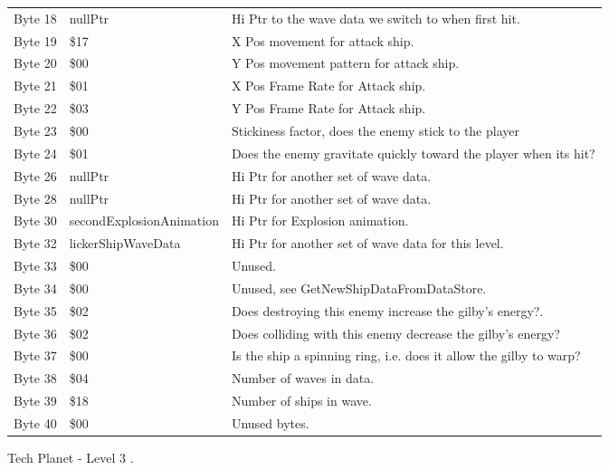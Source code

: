 \begin{figure}[H]
{\begin{adjustbox}{width=12cm}
\begin{tabular}{lll}
 Byte 18 & nullPtr                  & Hi Ptr to the wave data we switch to when first hit.               \\
 Byte 19 & \$17                      & X Pos movement for attack ship.                                    \\
 Byte 20 & \$00                      & Y Pos movement pattern for attack ship.                            \\
 Byte 21 & \$01                      & X Pos Frame Rate for Attack ship.                                  \\
 Byte 22 & \$03                      & Y Pos Frame Rate for Attack ship.                                  \\
 Byte 23 & \$00                      & Stickiness factor, does the enemy stick to the player              \\
 Byte 24 & \$01                      & Does the enemy gravitate quickly toward the player when its hit?   \\
 Byte 26 & nullPtr                  & Hi Ptr for another set of wave data.                               \\
 Byte 28 & nullPtr                  & Hi Ptr for another set of wave data.                               \\
 Byte 30 & secondExplosionAnimation & Hi Ptr for Explosion animation.                                    \\
 Byte 32 & lickerShipWaveData       & Hi Ptr for another set of wave data for this level.                \\
 Byte 33 & \$00                      & Unused.                                                            \\
 Byte 34 & \$00                      & Unused, see GetNewShipDataFromDataStore.                           \\
 Byte 35 & \$02                      & Does destroying this enemy increase the gilby's energy?.           \\
 Byte 36 & \$02                      & Does colliding with this enemy decrease the gilby's energy?        \\
 Byte 37 & \$00                      & Is the ship a spinning ring, i.e. does it allow the gilby to warp? \\
 Byte 38 & \$04                      & Number of waves in data.                                           \\
 Byte 39 & \$18                      & Number of ships in wave.                                           \\
 Byte 40 & \$00                      & Unused bytes.                                                      \\
\bottomrule
\end{tabular}

  \end{adjustbox}

  }\caption*{Tech Planet - Level 3
.}
\end{figure}

